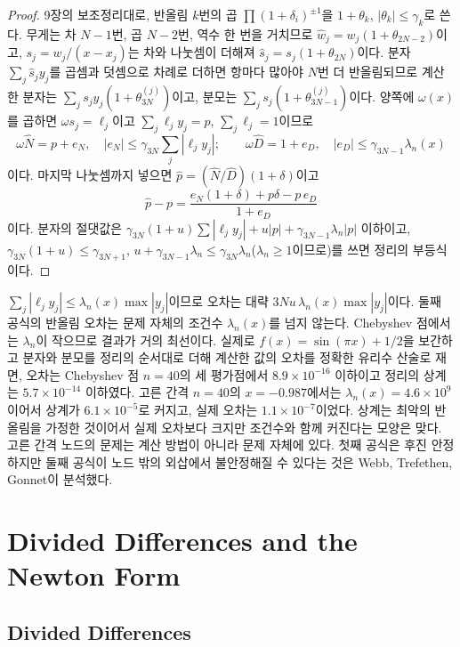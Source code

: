 \begin{proof}
9장의 보조정리대로, 반올림 $k$번의 곱 $\prod(1+\delta_i)^{\pm1}$을 $1+\theta_k$, $|\theta_k|\le\gamma_k$로 쓴다. 무게는 차 $N-1$번, 곱 $N-2$번, 역수 한 번을 거치므로 $\hat w_j=w_j(1+\theta_{2N-2})$이고, $s_j=w_j/(x-x_j)$는 차와 나눗셈이 더해져 $\hat s_j=s_j(1+\theta_{2N})$이다. 분자 $\sum_j\hat s_jy_j$를 곱셈과 덧셈으로 차례로 더하면 항마다 많아야 $N$번 더 반올림되므로 계산한 분자는 $\sum_js_jy_j(1+\theta^{(j)}_{3N})$이고, 분모는 $\sum_js_j(1+\theta^{(j)}_{3N-1})$이다. 양쪽에 $\omega(x)$를 곱하면 $\omega s_j=\ell_j$이고 $\sum_j\ell_jy_j=p$, $\sum_j\ell_j=1$이므로
\[
\omega\hat N=p+e_N,\quad|e_N|\le\gamma_{3N}\sum_j|\ell_jy_j|;\qquad\omega\hat D=1+e_D,\quad|e_D|\le\gamma_{3N-1}\lambda_n(x)
\]
이다. 마지막 나눗셈까지 넣으면 $\hat p=(\hat N/\hat D)(1+\delta)$이고
\[
\hat p-p=\frac{e_N(1+\delta)+p\delta-p\,e_D}{1+e_D}
\]
이다. 분자의 절댓값은 $\gamma_{3N}(1+u)\sum|\ell_jy_j|+u|p|+\gamma_{3N-1}\lambda_n|p|$ 이하이고, $\gamma_{3N}(1+u)\le\gamma_{3N+1}$, $u+\gamma_{3N-1}\lambda_n\le\gamma_{3N}\lambda_n$($\lambda_n\ge1$이므로)를 쓰면 정리의 부등식이다.
\end{proof}

$\sum_j|\ell_jy_j|\le\lambda_n(x)\max|y_j|$이므로 오차는 대략 $3Nu\,\lambda_n(x)\max|y_j|$이다. 둘째 공식의 반올림 오차는 문제 자체의 조건수 $\lambda_n(x)$를 넘지 않는다. Chebyshev 점에서는 $\lambda_n$이 작으므로 결과가 거의 최선이다. 실제로 $f(x)=\sin(\pi x)+1/2$을 보간하고 분자와 분모를 정리의 순서대로 더해 계산한 값의 오차를 정확한 유리수 산술로 재면, 오차는 Chebyshev 점 $n=40$의 세 평가점에서 $8.9\times10^{-16}$ 이하이고 정리의 상계는 $5.7\times10^{-14}$ 이하였다. 고른 간격 $n=40$의 $x=-0.987$에서는 $\lambda_n(x)=4.6\times10^9$이어서 상계가 $6.1\times10^{-5}$로 커지고, 실제 오차는 $1.1\times10^{-7}$이었다. 상계는 최악의 반올림을 가정한 것이어서 실제 오차보다 크지만 조건수와 함께 커진다는 모양은 맞다. 고른 간격 노드의 문제는 계산 방법이 아니라 문제 자체에 있다. 첫째 공식은 후진 안정하지만 둘째 공식이 노드 밖의 외삽에서 불안정해질 수 있다는 것은 Webb, Trefethen, Gonnet이 분석했다\cite{webb2012extrapolation}.

\section{Divided Differences and the Newton Form}
\label{sec:newton-form}

\subsection{Divided Differences}

